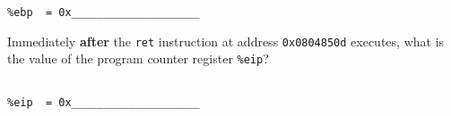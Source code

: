 \begin{problem}{8}
\begin{choice}
\begin{verbatim}
%ebp  = 0x____________________

\end{verbatim}

\item Immediately {\bf after} the {\tt ret} instruction at address
{\tt 0x0804850d} executes, what is the value of the program counter
register \verb:%eip:?
\begin{verbatim}

%eip  = 0x____________________

\end{verbatim}

\end{choice}
\end{problem}




